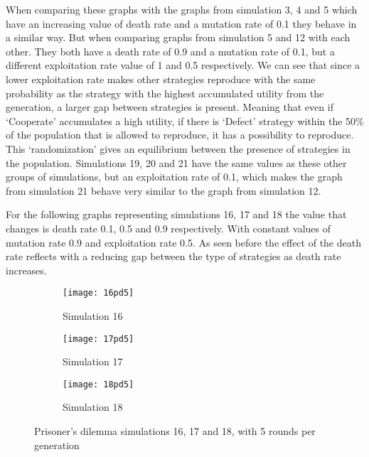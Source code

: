 When comparing these graphs with the graphs from simulation 3, 4 and 5 which have an increasing value of death rate and a mutation rate of 0.1 they behave in a similar way. But when comparing graphs from simulation 5 and 12 with each other. They both have a death rate of 0.9 and a mutation rate of 0.1, but a different exploitation rate value of 1 and 0.5 respectively. We can see that since a lower exploitation rate makes other strategies reproduce with the same probability as the strategy with the highest accumulated utility from the generation, a larger gap between strategies is present. Meaning that even if `Cooperate' accumulates a high utility, if there is `Defect' strategy within the 50\% of the population that is allowed to reproduce, it has a possibility to reproduce. This `randomization' gives an equilibrium between the presence of strategies in the population. Simulations 19, 20 and 21 have the same values as these other groups of simulations, but an exploitation rate of 0.1, which makes the graph from simulation 21 behave very similar to the graph from simulation 12. 

For the following graphs representing simulations 16, 17 and 18 the value that changes is death rate 0.1, 0.5 and 0.9 respectively. With constant values of mutation rate  0.9 and exploitation rate 0.5. As seen before the effect of the death rate reflects with a reducing gap between the type of strategies as death rate increases. 
 
\begin{figure}[H]       
    \centering
    \begin{subfigure}[b]{0.3\textwidth}
	\centering
	{\texttt{[image: 16pd5]}}   
    	\caption{Simulation 16}
	\label{fig:pds16}
    \end{subfigure}
    \hfill
    \begin{subfigure}[b]{0.3\textwidth}
	\centering
	{\texttt{[image: 17pd5]}}   
    	\caption{Simulation 17}
	\label{fig:pds17}
    \end{subfigure}
    \hfill
    \begin{subfigure}[b]{0.3\textwidth}
	\centering
	{\texttt{[image: 18pd5]}}   
    	\caption{Simulation 18}
	\label{fig:pds18}
    \end{subfigure}
    \caption{Prisoner's dilemma simulations 16, 17 and 18, with 5 rounds per generation}
    \label{pdsim161718r5}
\end{figure}

